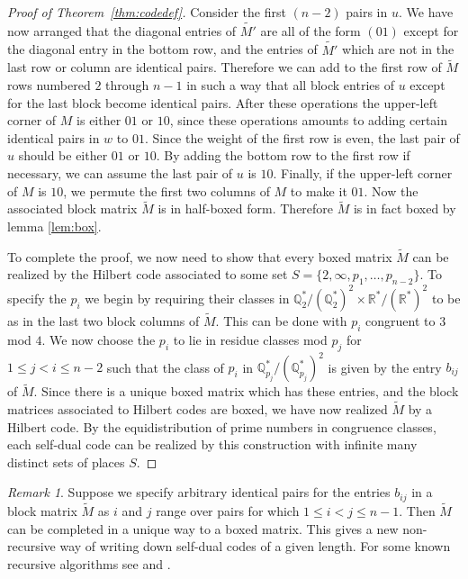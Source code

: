 \documentclass[noams]{compositio}
\theoremstyle{definition} %
\theoremstyle{remark} %
\newtheorem{rem}{Remark}
\newcommand{\Q}{\mathbb{Q}}
\newcommand{\R}{\mathbb{R}}
\begin{document}
\begin{proof}[Proof of Theorem~\ref{thm:codedef}]
Consider the first $(n-2)$ pairs in $u$.  We have now arranged that the diagonal entries of $\tilde{M'}$
are all of the form $(01)$ except for the diagonal entry in the bottom row, and the entries of $\tilde{M'}$
which are not in the last row or column are identical pairs.  Therefore we can add to the first row of $\tilde{M}$
rows numbered $2$ through $n-1$ in such a way that all block entries of $u$ except for the last block become
identical pairs.   After these operations the upper-left corner of $M$ is either $01$ or $10$, since these operations amounts to adding certain identical pairs in $w$ to $01$.  Since the weight of the first row is even, the last pair of $u$ should be either $01$ or $10$. By adding the bottom row to the first row if necessary, we can assume the last pair of $u$ is $10$. Finally, if the upper-left corner of $M$ is $10$, we permute the first two columns of $M$ to make it $01$. Now the associated block matrix $\tilde{M}$ is in half-boxed form.  Therefore $\tilde{M}$ is in fact boxed by lemma \ref{lem:box}.

To complete the proof, we now need to show that every boxed matrix $\tilde{M}$
can be realized by the Hilbert code associated to some set $S = \{2,\infty,p_1,\ldots,p_{n-2}\}$.
To specify the $p_i$ we begin by requiring their classes in $\Q_2^*/(\Q_2^*)^2 \times \R^*/(\R^*)^2$ to be as in
the last two block columns of $\tilde{M}$.  This can be done with $p_i$ congruent to $3$ mod $4$.
We now choose the $p_i$ to lie in residue classes mod $p_j$ for $1 \le j < i \le n-2$ such
that the class of $p_i$ in $\Q_{p_j}^*/(\Q_{p_j}^*)^2$ is given by the entry $b_{ij}$ of $\tilde{M}$.
Since there is a unique boxed matrix which has these entries, and the block matrices
associated to Hilbert codes are boxed, we have now realized $\tilde{M}$ by a Hilbert code.
By the equidistribution of prime numbers in congruence classes, each self-dual code can be realized by this construction with infinite many distinct sets of places $S$.
\end{proof}

\begin{rem}
Suppose we specify arbitrary identical pairs for the entries $b_{ij}$ in a block matrix $\tilde{M}$
as $i$ and $j$ range over pairs for which $1 \le i < j \le n-1$.  Then $\tilde{M}$ can be completed
in a unique way to a boxed matrix.  This gives a new non-recursive way of writing down self-dual codes
of a given length. For some known recursive algorithms see \cite{Bilous2002} and \cite{Bouyuklieva2011}.
\end{rem}
\end{document}
